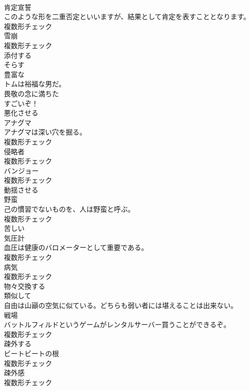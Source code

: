 \documentclass[8pt]{extreport}
\begin{document}
\begin{CJK}{UTF8}{min}
\\	[名詞]	肯定宣誓	
\\	このような形を二重否定といいますが、結果として肯定を表すこととなります。	
\\	複数形チェック
\\	[名詞]	雪崩	
\\	複数形チェック
\\	[動詞]	添付する	
\\	[動詞]	そらす	
\\	[形容詞]	豊富な	
\\	トムは裕福な男だ。	
\\	[形容詞]	畏敬の念に満ちた	
\\	すごいぞ！	
\\	[動詞]	悪化させる	
\\	[名詞]	アナグマ	
\\	アナグマは深い穴を掘る。	
\\	複数形チェック
\\	[名詞]	侵略者	
\\	複数形チェック
\\	[名詞]	バンジョー	
\\	複数形チェック
\\	[動詞]	動揺させる	
\\	[名詞]	野蛮	
\\	己の慣習でないものを、人は野蛮と呼ぶ。	
\\	複数形チェック
\\	[形容詞]	苦しい	
\\	[名詞]	気圧計	
\\	血圧は健康のバロメーターとして重要である。	
\\	複数形チェック
\\	[名詞]	病気	
\\	複数形チェック
\\	[動詞]	物々交換する	
\\	[形容詞]	類似して	
\\	自由は山巓の空気に似ている。どちらも弱い者には堪えることは出来ない。	
\\	[名詞]	戦場	
\\	バットルフィルドというゲームがレンタルサーバー買うことができるぞ。	
\\	複数形チェック
\\	[動詞]	疎外する	
\\	[名詞]	ビートビートの根	
\\	複数形チェック
\\	[名詞]	疎外感	
\\	複数形チェック

\end{CJK}
\end{document}
